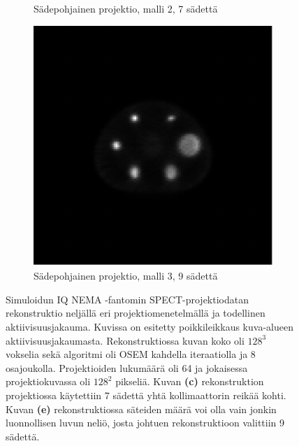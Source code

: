 \begin{figure}[H]
\begin{subfigure}[b]{.25\textwidth}
        \caption{Sädepohjainen projektio, malli 2, 7 sädettä}
    \end{subfigure}%
    \hspace{.075\textwidth}%
    \begin{subfigure}[b]{.25\textwidth}
        \includegraphics[width=\linewidth]{kuvat/nema_rekonstruktio_proj1_malli3_nRay9.pdf}
        \caption{Sädepohjainen projektio, malli 3, 9 sädettä}
    \end{subfigure}
    \caption{Simuloidun IQ NEMA -fantomin SPECT-projektiodatan rekonstruktio neljällä eri projektiomenetelmällä ja todellinen aktiivisuusjakauma. Kuvissa on esitetty poikkileikkaus kuva-alueen aktiivisuusjakaumasta. Rekonstruktiossa kuvan koko oli $128^3$ vokselia sekä algoritmi oli OSEM kahdella iteraatiolla ja 8 osajoukolla. Projektioiden lukumäärä oli 64 ja jokaisessa projektiokuvassa oli $128^2$ pikseliä. Kuvan \textbf{(c)} rekonstruktion projektiossa käytettiin 7 sädettä yhtä kollimaattorin reikää kohti. Kuvan \textbf{(e)} rekonstruktiossa säteiden määrä voi olla vain jonkin luonnollisen luvun neliö, josta johtuen rekonstruktioon valittiin 9 sädettä.}
    \label{fig:nema-rekonstruktiot}
\end{figure}

